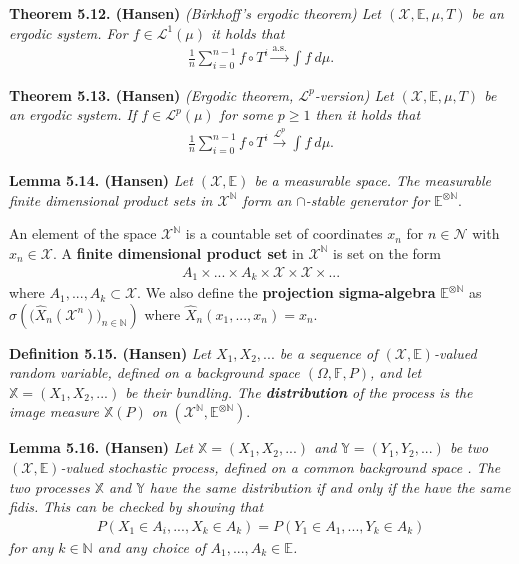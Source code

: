 \documentclass[
]{book}
\begin{document}
\textbf{Theorem 5.12. (Hansen)} \emph{(Birkhoff's ergodic theorem) Let \((\mathcal{X},\mathbb{E},\mu,T)\) be an ergodic system. For \(f\in \mathcal{L}^1(\mu)\) it holds that}
\begin{align*}
    \frac{1}{n}\sum_{i=0}^{n-1}f\circ T^i\stackrel{\text{a.s.}}{\to} \int f\ d\mu.\tag{5.16}
\end{align*}

\textbf{Theorem 5.13. (Hansen)} \emph{(Ergodic theorem, \(\mathcal{L}^p\)-version) Let \((\mathcal{X},\mathbb{E},\mu,T)\) be an ergodic system. If \(f\in \mathcal{L}^p(\mu)\) for some \(p\ge 1\) then it holds that}
\begin{align*}
    \frac{1}{n}\sum_{i=0}^{n-1}f\circ T^i\stackrel{\mathcal{L}^p}{\to}\int f\ d\mu.\tag{5.21}
\end{align*}

\textbf{Lemma 5.14. (Hansen)} \emph{Let \((\mathcal{X},\mathbb{E})\) be a measurable space. The measurable finite dimensional product sets in \(\mathcal{X}^{\mathbb{N}}\) form an \(\cap\)-stable generator for} \({\mathbb{E}}^{\otimes\mathbb{N}}\).

An element of the space \(\mathcal{X}^{\mathbb{N}}\) is a countable set of coordinates \(x_n\) for \(n\in\mathcal{N}\) with \(x_n\in\mathcal{X}\). A \textbf{finite dimensional product set} in \(\mathcal{X}^{\mathbb{N}}\) is set on the form
\begin{align*}
    A_1\times ... \times A_k\times \mathcal{X}\times \mathcal{X}\times ...
\end{align*}
where \(A_1,...,A_k\subset \mathcal{X}\). We also define the \textbf{projection sigma-algebra} \(\mathbb{E}^{\otimes \mathbb{N}}\) as \(\sigma\left(\big(\hat{X}_n(\mathcal{X}^n)\big)_{n\in\mathbb{N}}\right)\) where \(\hat{X}_n(x_1,...,x_n)=x_n\).

\textbf{Definition 5.15. (Hansen)} \emph{Let \(X_1,X_2,...\) be a sequence of \((\mathcal{X},\mathbb{E})\)-valued random variable, defined on a background space \((\Omega,\mathbb{F},P)\), and let \(\mathbb{X}=(X_1,X_2,...)\) be their bundling. The \textbf{distribution} of the process is the image measure \(\mathbb{X}(P)\) on} \((\mathcal{X}^{\mathbb{N}},{\mathbb{E}}^{\otimes \mathbb{N}})\).

\textbf{Lemma 5.16. (Hansen)} \emph{Let \(\mathbb{X}=(X_1,X_2,...)\) and \(\mathbb{Y}=(Y_1,Y_2,...)\) be two \((\mathcal{X},\mathbb{E})\)-valued stochastic process, defined on a common background space . The two processes \(\mathbb{X}\) and \(\mathbb{Y}\) have the same distribution if and only if the have the same fidis.}
\emph{This can be checked by showing that}
\begin{align*}
    P(X_1\in A_i,...,X_k\in A_k)=P(Y_1\in A_1,...,Y_k\in A_k)\tag{5.25}
\end{align*}
\emph{for any \(k\in\mathbb{N}\) and any choice of \(A_1,...,A_k\in\mathbb{E}\).}
\end{document}
